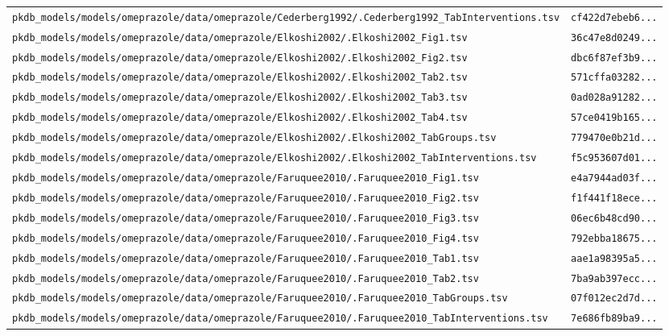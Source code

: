 \documentclass{article}
\begin{document}
\begin{longtable}{ll}
\texttt{pkdb\_models/models/omeprazole/data/omeprazole/Cederberg1992/.Cederberg1992\_TabInterventions.tsv} & \texttt{cf422d7ebeb6...} \\
\texttt{pkdb\_models/models/omeprazole/data/omeprazole/Elkoshi2002/.Elkoshi2002\_Fig1.tsv} & \texttt{36c47e8d0249...} \\
\texttt{pkdb\_models/models/omeprazole/data/omeprazole/Elkoshi2002/.Elkoshi2002\_Fig2.tsv} & \texttt{dbc6f87ef3b9...} \\
\texttt{pkdb\_models/models/omeprazole/data/omeprazole/Elkoshi2002/.Elkoshi2002\_Tab2.tsv} & \texttt{571cffa03282...} \\
\texttt{pkdb\_models/models/omeprazole/data/omeprazole/Elkoshi2002/.Elkoshi2002\_Tab3.tsv} & \texttt{0ad028a91282...} \\
\texttt{pkdb\_models/models/omeprazole/data/omeprazole/Elkoshi2002/.Elkoshi2002\_Tab4.tsv} & \texttt{57ce0419b165...} \\
\texttt{pkdb\_models/models/omeprazole/data/omeprazole/Elkoshi2002/.Elkoshi2002\_TabGroups.tsv} & \texttt{779470e0b21d...} \\
\texttt{pkdb\_models/models/omeprazole/data/omeprazole/Elkoshi2002/.Elkoshi2002\_TabInterventions.tsv} & \texttt{f5c953607d01...} \\
\texttt{pkdb\_models/models/omeprazole/data/omeprazole/Faruquee2010/.Faruquee2010\_Fig1.tsv} & \texttt{e4a7944ad03f...} \\
\texttt{pkdb\_models/models/omeprazole/data/omeprazole/Faruquee2010/.Faruquee2010\_Fig2.tsv} & \texttt{f1f441f18ece...} \\
\texttt{pkdb\_models/models/omeprazole/data/omeprazole/Faruquee2010/.Faruquee2010\_Fig3.tsv} & \texttt{06ec6b48cd90...} \\
\texttt{pkdb\_models/models/omeprazole/data/omeprazole/Faruquee2010/.Faruquee2010\_Fig4.tsv} & \texttt{792ebba18675...} \\
\texttt{pkdb\_models/models/omeprazole/data/omeprazole/Faruquee2010/.Faruquee2010\_Tab1.tsv} & \texttt{aae1a98395a5...} \\
\texttt{pkdb\_models/models/omeprazole/data/omeprazole/Faruquee2010/.Faruquee2010\_Tab2.tsv} & \texttt{7ba9ab397ecc...} \\
\texttt{pkdb\_models/models/omeprazole/data/omeprazole/Faruquee2010/.Faruquee2010\_TabGroups.tsv} & \texttt{07f012ec2d7d...} \\
\texttt{pkdb\_models/models/omeprazole/data/omeprazole/Faruquee2010/.Faruquee2010\_TabInterventions.tsv} & \texttt{7e686fb89ba9...} \\

\end{longtable}
\end{document}
